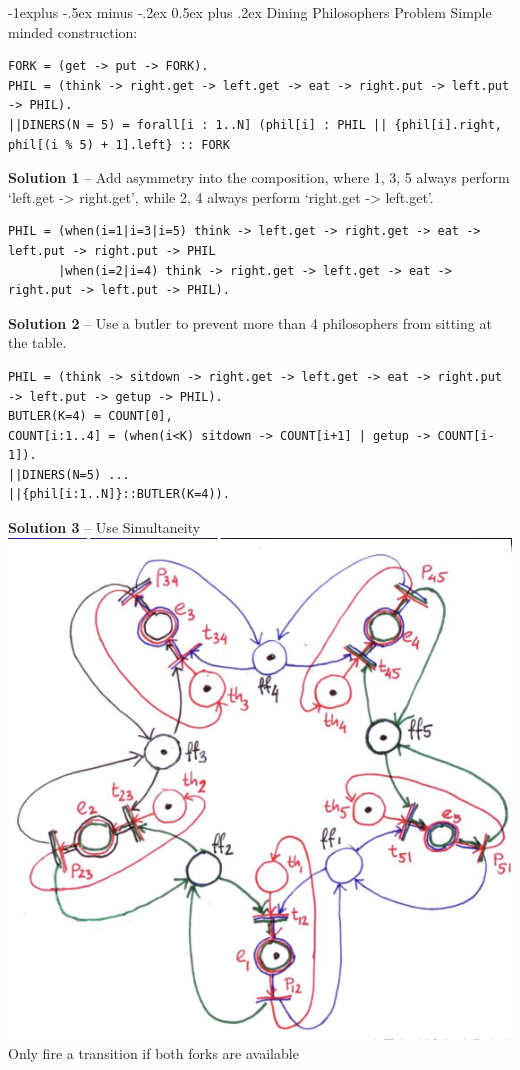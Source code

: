 \documentclass[letterpaper, 8pt]{extarticle}
\makeatletter
\renewcommand{\subsection}{\@startsection{subsection}{2}{0mm}%
                                {-1explus -.5ex minus -.2ex}%
                                {0.5ex plus .2ex}%
                                {\normalfont\small\bfseries}}
\makeatother
\begin{document}
\begin{multicols*}{5}
  \subsection{Dining Philosophers Problem}
  Simple minded construction:
  \begin{lstlisting}
FORK = (get -> put -> FORK).
PHIL = (think -> right.get -> left.get -> eat -> right.put -> left.put -> PHIL).
||DINERS(N = 5) = forall[i : 1..N] (phil[i] : PHIL || {phil[i].right, phil[(i % 5) + 1].left} :: FORK
\end{lstlisting}

  \textbf{Solution 1} -- Add asymmetry into the composition, where 1, 3, 5 always perform `left.get -> right.get',
  while 2, 4 always perform `right.get -> left.get'.
  \begin{lstlisting}
PHIL = (when(i=1|i=3|i=5) think -> left.get -> right.get -> eat -> left.put -> right.put -> PHIL
       |when(i=2|i=4) think -> right.get -> left.get -> eat -> right.put -> left.put -> PHIL).
\end{lstlisting}

  \textbf{Solution 2} -- Use a butler to prevent more than 4 philosophers from sitting at the table.
  \begin{lstlisting}
PHIL = (think -> sitdown -> right.get -> left.get -> eat -> right.put -> left.put -> getup -> PHIL).
BUTLER(K=4) = COUNT[0],
COUNT[i:1..4] = (when(i<K) sitdown -> COUNT[i+1] | getup -> COUNT[i-1]).
||DINERS(N=5) ...
||{phil[i:1..N]}::BUTLER(K=4)).
\end{lstlisting}

  \textbf{Solution 3} -- Use Simultaneity
  \includegraphics[width=\linewidth]{COMPSCI-2SD3/phil-sim.png}
  Only fire a transition if both forks are available


\end{multicols*}
\end{document}
